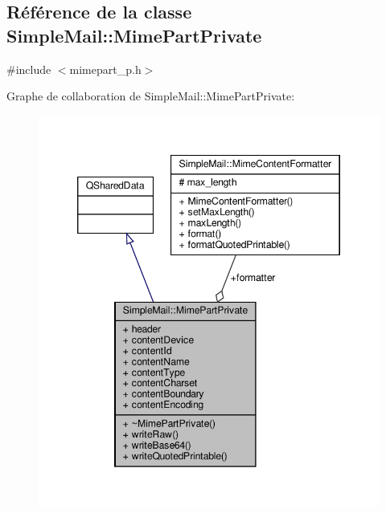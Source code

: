 \hypertarget{class_simple_mail_1_1_mime_part_private}{}\subsection{Référence de la classe Simple\+Mail\+:\+:Mime\+Part\+Private}
\label{class_simple_mail_1_1_mime_part_private}


{\ttfamily \#include $<$mimepart\+\_\+p.\+h$>$}



Graphe de collaboration de Simple\+Mail\+:\+:Mime\+Part\+Private\+:\nopagebreak
\begin{figure}[H]
\begin{center}
\leavevmode
\includegraphics[width=346pt]{class_simple_mail_1_1_mime_part_private__coll__graph}
\end{center}
\end{figure}
